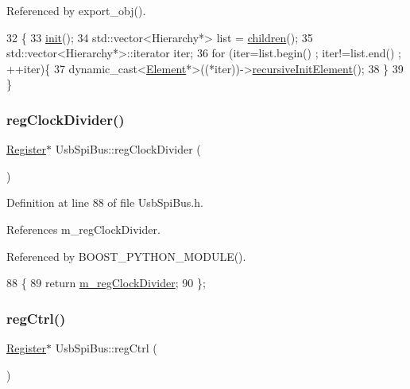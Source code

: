Referenced by export\+\_\+obj().


\begin{DoxyCode}
32                                   \{
33   \hyperlink{classElement_af42754b5cabc198869222725218d695c}{init}();
34   std::vector<Hierarchy*> list = \hyperlink{classHierarchy_aa9a76f69e98e052ee1a6e32cea006288}{children}();
35   std::vector<Hierarchy*>::iterator iter;
36   \textcolor{keywordflow}{for} (iter=list.begin() ; iter!=list.end() ; ++iter)\{
37     \textcolor{keyword}{dynamic\_cast<}\hyperlink{classElement}{Element}*\textcolor{keyword}{>}((*iter))->\hyperlink{classElement_a3c0abcb36f8906688bb7e32608df7086}{recursiveInitElement}();
38   \}
39 \}
\end{DoxyCode}
\mbox{\label{classUsbSpiBus_a338edc7bdac1abd1998890bb1aa0509a}} 
\subsubsection{\texorpdfstring{reg\+Clock\+Divider()}{regClockDivider()}}
{\footnotesize\ttfamily \hyperlink{classRegister}{Register}$\ast$ Usb\+Spi\+Bus\+::reg\+Clock\+Divider (\begin{DoxyParamCaption}{ }\end{DoxyParamCaption})\hspace{0.3cm}{\ttfamily [inline]}}



Definition at line 88 of file Usb\+Spi\+Bus.\+h.



References m\+\_\+reg\+Clock\+Divider.



Referenced by B\+O\+O\+S\+T\+\_\+\+P\+Y\+T\+H\+O\+N\+\_\+\+M\+O\+D\+U\+L\+E().


\begin{DoxyCode}
88                               \{
89     \textcolor{keywordflow}{return} \hyperlink{classUsbSpiBus_abfd5f040a0a8c19d972b26ea581bf1f0}{m\_regClockDivider};
90   \};
\end{DoxyCode}
\mbox{\label{classUsbSpiBus_a22900de7a32af6916f74584f2172424a}} 
\subsubsection{\texorpdfstring{reg\+Ctrl()}{regCtrl()}}
{\footnotesize\ttfamily \hyperlink{classRegister}{Register}$\ast$ Usb\+Spi\+Bus\+::reg\+Ctrl (\begin{DoxyParamCaption}{ }\end{DoxyParamCaption})\hspace{0.3cm}{\ttfamily [inline]}}



